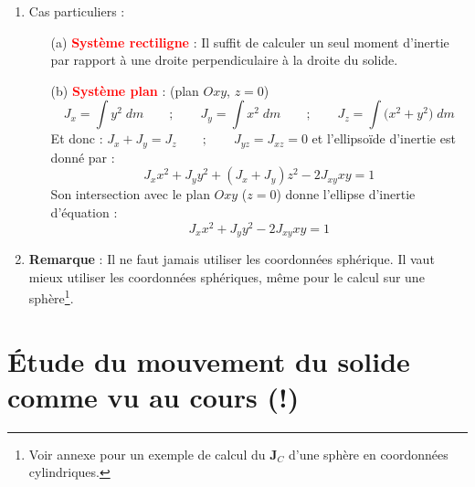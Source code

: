 \documentclass[a4paper]{article}
\begin{document}
\begin{enumerate}
\item Cas particuliers : 
\begin{enumerate}
\item[(a)] \textcolor{red}{\textbf{Système rectiligne}} : Il suffit de calculer un seul moment d'inertie par rapport à une droite perpendiculaire à la droite du solide.
\item[(b)] \textcolor{red}{\textbf{Système plan}} : (plan $ Oxy $, $ z = 0 $)
\[ J_x = \int y^2 \; d m \qquad ; \qquad J_y = \int x^2 \; d m \qquad ; \qquad J_z = \int \Big( x^2 + y^2 \Big) \; d m \]
Et donc : $\displaystyle J_x + J_y = J_z \qquad ; \qquad J_{y z} = J_{x z} = 0 $ et l'ellipsoïde d'inertie est donné par : 
\[ J_x x^2 + J_y y^2 + (J_x + J_y) z^2 - 2 J_{x y} x y = 1 \]
Son intersection avec le plan $ Oxy $ ($ z = 0 $) donne l'ellipse d'inertie d'équation : 
\[ J_x x^2 + J_y y^2 - 2 J_{x y} x y = 1 \]
\end{enumerate}





\item \textbf{Remarque} : Il ne faut jamais utiliser les coordonnées sphérique. Il vaut mieux utiliser les coordonnées sphériques, même pour le calcul sur une sphère\footnote{Voir annexe pour un exemple de calcul du $ \textbf{J}_C $ d'une sphère en coordonnées cylindriques.}.


\end{enumerate}










\section{Étude du mouvement du solide comme vu au cours (!)}
\end{document}
